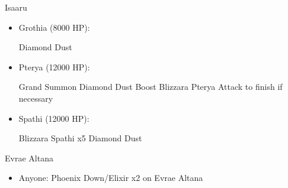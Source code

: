 \begin{battle}{Isaaru}
	\begin{itemize}
		\item Grothia (8000 HP):
			\begin{itemize}
				\summon{\shiva}
				\shivaf Diamond Dust
			\end{itemize}
		\item Pterya (12000 HP):
			\begin{itemize}
				\yunaf Grand Summon \shiva
				\shivaf Diamond Dust
				\shivaf Boost
				\shivaf Blizzara Pterya
				\shivaf Attack to finish if necessary
			\end{itemize}
		\item Spathi (12000 HP):
			\begin{itemize}
				\summon{\shiva}
				\shivaf Blizzara Spathi x5
				\shivaf Diamond Dust
			\end{itemize}
	\end{itemize}
\end{battle}
\begin{battle}{Evrae Altana}
	\begin{itemize}
		\item Anyone: Phoenix Down/Elixir x2 on Evrae Altana
	\end{itemize}
\end{battle}
